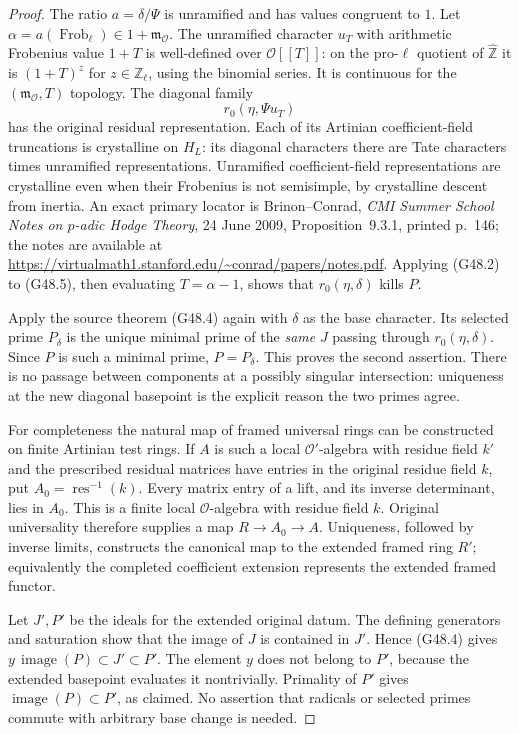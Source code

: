 \begin{proof}
The ratio $a=\delta/\Psi$ is unramified and has values
congruent to $1$.  Let $\alpha=a(\operatorname{Frob}_\ell)
\in1+\mathfrak m_{\mathcal O}$.  The unramified character
$u_T$ with arithmetic Frobenius value $1+T$ is well-defined
over $\mathcal O[[T]]$: on the pro-$\ell$ quotient of
$\widehat{\mathbb Z}$ it is $(1+T)^z$ for
$z\in\mathbb Z_\ell$, using the binomial series.
It is continuous for the $(\mathfrak m_{\mathcal O},T)$
topology.  The diagonal family
\[
                  r_0(\eta,\Psi u_T)                  \tag{G48.5}
\]
has the original residual representation.  Each of its
Artinian coefficient-field truncations is crystalline on
$H_L$: its diagonal characters there are Tate characters
times unramified representations.  Unramified
coefficient-field representations are crystalline even when
their Frobenius is not semisimple, by crystalline descent
from inertia.  An exact primary locator is Brinon--Conrad,
\emph{CMI Summer School Notes on $p$-adic Hodge Theory},
24 June 2009, Proposition~9.3.1, printed p.~146;
the notes are available at
\url{https://virtualmath1.stanford.edu/~conrad/papers/notes.pdf}.
Applying (G48.2) to (G48.5), then evaluating
$T=\alpha-1$, shows that $r_0(\eta,\delta)$ kills $P$.

Apply the source theorem (G48.4) again with $\delta$ as
the base character.  Its selected prime $P_\delta$ is
the unique minimal prime of the \emph{same} $J$ passing
through $r_0(\eta,\delta)$.  Since $P$ is such a minimal
prime, $P=P_\delta$.  This proves the second assertion.
There is no passage between components at a possibly singular
intersection: uniqueness at the new diagonal basepoint is
the explicit reason the two primes agree.

For completeness the natural map of framed universal rings
can be constructed on finite Artinian test rings.
If $A$ is such a local $\mathcal O'$-algebra with residue
field $k'$ and the prescribed residual matrices have entries
in the original residue field $k$, put
$A_0=\operatorname{res}^{-1}(k)$.  Every matrix entry of a
lift, and its inverse determinant, lies in $A_0$.
This is a finite local $\mathcal O$-algebra with residue
field $k$.  Original universality therefore supplies a
map $R\to A_0\to A$.  Uniqueness, followed by inverse
limits, constructs the canonical map to the extended framed
ring $R'$; equivalently the completed coefficient extension
represents the extended framed functor.

Let $J',P'$ be the ideals for the extended original datum.
The defining generators and saturation show that the image
of $J$ is contained in $J'$.  Hence (G48.4) gives
$y\,\operatorname{image}(P)\subset J'\subset P'$.
The element $y$ does not belong to $P'$, because the extended
basepoint evaluates it nontrivially.  Primality of $P'$ gives
$\operatorname{image}(P)\subset P'$, as claimed.
No assertion that radicals or selected primes commute with
arbitrary base change is needed.
\end{proof}


